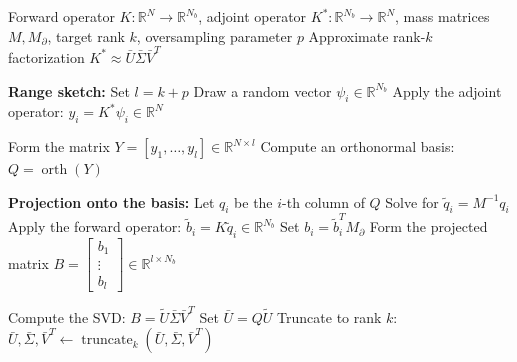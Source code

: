 \begin{algorithm}[!thbp]
\caption{Matrix-free rSVD approximation of $K^*$}
\label{alg:discrete_rsvd_Kstar}
\begin{algorithmic}[1]
    \Require Forward operator $K: \mathbb{R}^N \to \mathbb{R}^{N_b}$, adjoint operator $K^*: \mathbb{R}^{N_b} \to \mathbb{R}^N$, mass matrices $M, M_\partial$, target rank $k$, oversampling parameter $p$
    \Ensure Approximate rank-$k$ factorization $K^* \approx \bar U \bar \Sigma \bar V^T$

    \State \textbf{Range sketch:}
    \State Set $l = k + p$
        \State Draw a random vector $\psi_i \in \mathbb{R}^{N_b}$
        \State Apply the adjoint operator: $y_i = K^* \psi_i \in \mathbb{R}^N$
    \EndFor

    \State Form the matrix $Y = [y_1, \dots, y_l] \in \mathbb{R}^{N \times l}$ 
    \State Compute an orthonormal basis: $Q = \operatorname{orth}(Y)$

    \State \textbf{Projection onto the basis:}
        \State Let $q_i$ be the $i$-th column of $Q$
        \State Solve for $\tilde q_i = M^{-1} q_i$
        \State Apply the forward operator: $\tilde{b}_i = K \tilde q_i \in \mathbb{R}^{N_b}$
        \State Set $b_i = \tilde{b}_i^T M_\partial$ 
    \EndFor
    \State Form the projected matrix $B = \begin{bmatrix} b_1 \\ \vdots \\ b_l \end{bmatrix} \in \mathbb{R}^{l \times N_b}$

    \State Compute the SVD: $B = \tilde{U} \bar \Sigma \bar V^T$
    \State Set $\bar U = Q \tilde{U}$
    \State Truncate to rank $k$: $\bar U, \bar \Sigma, \bar V^T \leftarrow \operatorname{truncate}_k(\bar U, \bar \Sigma, \bar V^T)$

\end{algorithmic}
\end{algorithm}
